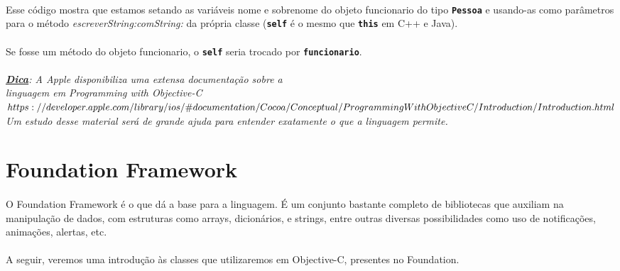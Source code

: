 \documentclass[a4paper,12pt,brazil,doubleside]{book}
\begin{document}
\paragraph{}Esse código mostra que estamos setando as variáveis nome e sobrenome do objeto funcionario do tipo \texttt{\textbf{Pessoa}} e usando-as como parâmetros para o método \emph{escreverString:comString:} da própria classe (\texttt{\textbf{self}} é o mesmo que \texttt{\textbf{this}} em C++ e Java).
\paragraph{}Se fosse um método do objeto funcionario, o \texttt{\textbf{self}} seria trocado por \texttt{\textbf{funcionario}}.

\bigskip

\paragraph{}\textit{\textbf{\underline{Dica}}: A Apple disponibiliza uma extensa documentação sobre a\\linguagem em Programming with Objective-C\\ \(https://developer.apple.com/library/ios/\#documentation/Cocoa/Conceptual/\\ProgrammingWithObjectiveC/Introduction/Introduction.html \)\\
Um estudo desse material será de grande ajuda para entender exatamente o que a linguagem permite.}

\bigskip
\bigskip


\section{Foundation Framework}

\paragraph{}O Foundation Framework é o que dá a base para a linguagem. É um conjunto bastante completo de bibliotecas que auxiliam na manipulação de dados, com estruturas como arrays, dicionários, e strings, entre outras diversas possibilidades como uso de notificações, animações, alertas, etc.
\paragraph{}A seguir, veremos uma introdução às classes que utilizaremos em Objective-C, presentes no Foundation.
\end{document}
